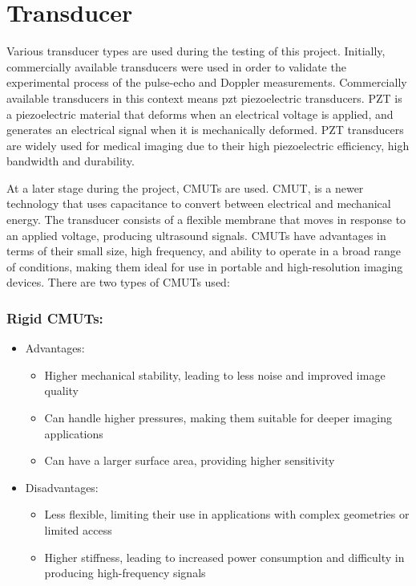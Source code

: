 \section{Transducer}
Various \gls{transducer} types are used during the testing of this project. Initially, commercially available transducers were used in order to validate the experimental process of the pulse-echo and Doppler measurements. Commercially available transducers in this context means \gls{pzt} \gls{piezoelectric} transducers. PZT is a piezoelectric material that deforms when an electrical voltage is applied, and generates an electrical signal when it is mechanically deformed. PZT transducers are widely used for medical imaging due to their high piezoelectric efficiency, high bandwidth and durability.

At a later stage during the project, CMUTs are used. CMUT, is a newer technology that uses capacitance to convert between electrical and mechanical energy. The transducer consists of a flexible membrane that moves in response to an applied voltage, producing ultrasound signals. CMUTs have advantages in terms of their small size, high frequency, and ability to operate in a broad range of conditions, making them ideal for use in portable and high-resolution imaging devices. There are two types of CMUTs used:

\subsubsection{Rigid CMUTs:}
\begin{itemize}
	\item Advantages:
	\begin{itemize}
		\item Higher mechanical stability, leading to less noise and improved image quality
		\item Can handle higher pressures, making them suitable for deeper imaging applications
		\item Can have a larger surface area, providing higher sensitivity
	\end{itemize}
	\item Disadvantages:
	\begin{itemize}
		\item Less flexible, limiting their use in applications with complex geometries or limited access
		\item Higher stiffness, leading to increased power consumption and difficulty in producing high-frequency signals
	\end{itemize}
\end{itemize}
